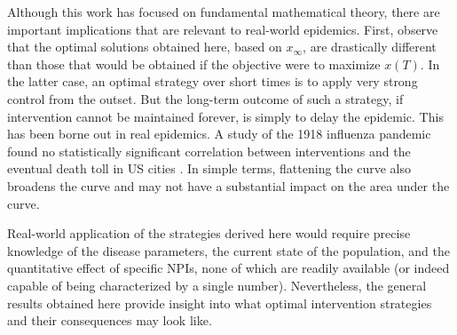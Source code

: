 \documentclass[english,12pt,letter]{article}
\newcommand{\Sinf}{x_\infty}
\begin{document}
Although this work has focused on fundamental mathematical theory, there are
important implications that are relevant to real-world epidemics.  First,
observe that the optimal solutions obtained here, based on $\Sinf$, are
drastically different than those that would be obtained if the objective
were to maximize $x(T)$.  In the latter case, an optimal strategy over
short times is to apply very strong control from the outset.  But the long-term
outcome of such a strategy, if intervention cannot be maintained forever,
is simply to delay the epidemic.  This has been borne out in real epidemics.
A study of the 1918 influenza pandemic found no statistically significant
correlation between interventions and the eventual death toll in US cities
\cite{hatchett2007public}.  In simple terms, flattening the curve also
broadens the curve and may not have a substantial impact on the area under the
curve.

Real-world application of the strategies derived here would require
precise knowledge of the disease parameters, the current state of the
population, and the quantitative effect of specific NPIs, none of which
are readily available (or indeed capable of being characterized by a single
number).  Nevertheless, the general results obtained here provide insight
into what optimal intervention strategies and their consequences may look like.




\end{document}
